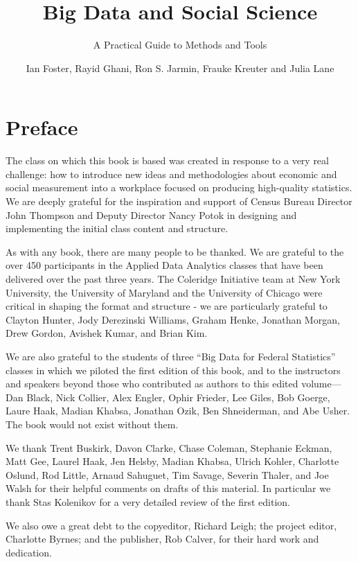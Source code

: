 \documentclass[]{krantz}
\title{Big Data and Social Science}
\subtitle{A Practical Guide to Methods and Tools}
\author{Ian Foster, Rayid Ghani, Ron S. Jarmin, Frauke Kreuter and Julia Lane}
\date{}
\begin{document}
\maketitle

{
\setcounter{tocdepth}{1}
\tableofcontents
}
\listoftables
\listoffigures
\chapter*{Preface}\label{preface}

The class on which this book is based was created in response to a very
real challenge: how to introduce new ideas and methodologies about
economic and social measurement into a workplace focused on producing
high-quality statistics. We are deeply grateful for the inspiration and
support of Census Bureau Director John Thompson and Deputy Director
Nancy Potok in designing and implementing the initial class content and
structure.

As with any book, there are many people to be thanked. We are grateful
to the over 450 participants in the Applied Data Analytics classes that
have been delivered over the past three years. The Coleridge Initiative
team at New York University, the University of Maryland and the
University of Chicago were critical in shaping the format and structure
- we are particularly grateful to Clayton Hunter, Jody Derezinski
Williams, Graham Henke, Jonathan Morgan, Drew Gordon, Avishek Kumar, and
Brian Kim.

We are also grateful to the students of three ``Big Data for Federal
Statistics'' classes in which we piloted the first edition of this book,
and to the instructors and speakers beyond those who contributed as
authors to this edited volume---Dan Black, Nick Collier, Alex Engler,
Ophir Frieder, Lee Giles, Bob Goerge, Laure Haak, Madian Khabsa,
Jonathan Ozik, Ben Shneiderman, and Abe Usher. The book would not exist
without them.

We thank Trent Buskirk, Davon Clarke, Chase Coleman, Stephanie Eckman,
Matt Gee, Laurel Haak, Jen Helsby, Madian Khabsa, Ulrich Kohler,
Charlotte Oslund, Rod Little, Arnaud Sahuguet, Tim Savage, Severin
Thaler, and Joe Walsh for their helpful comments on drafts of this
material. In particular we thank Stas Kolenikov for a very detailed
review of the first edition.

We also owe a great debt to the copyeditor, Richard Leigh; the project
editor, Charlotte Byrnes; and the publisher, Rob Calver, for their hard
work and dedication.
\end{document}
